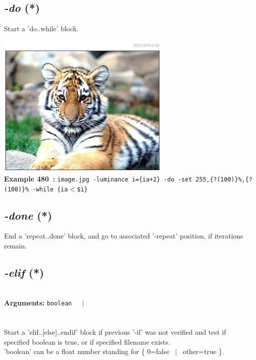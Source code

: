 \documentclass[a4paper,11pt,twoside]{book}
\begin{document}
\subsection{\emph{-do} (*)}\vspace*{-0.5em}
Start a 'do..while' block.
\begin{center}\includegraphics[keepaspectratio=true,height=7cm,width=\textwidth]{img/gmic_def480.jpg}\\
{\footnotesize \textbf{Example 480~:} \texttt{image.jpg -luminance i=\{ia+2\} -do -set 255,\{?(100)\}\%,\{?(100)\}\% -while \{ia$<$\$i\}}}
\end{center}

\subsection{\emph{-done} (*)}\vspace*{-0.5em}
End a 'repeat..done' block, and go to associated '-repeat' position, if iterations remain.


\subsection{\emph{-elif} (*)}\vspace*{-0.5em}
~\\\textbf{Arguments: } 
{\small \texttt{boolean}}~~~$|$\\
\\~\\
Start a 'elif..[else]..endif' block if previous '-if' was not verified
and test if specified boolean is true, or if specified filename exists.
~\\'boolean' can be a float number standing for \{ 0=false ~$|$~ other=true \}.
\end{document}
